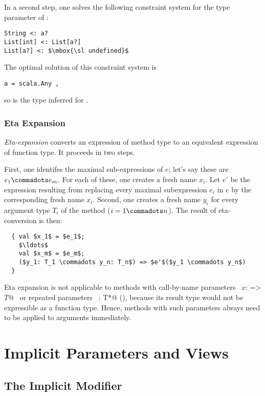 In a second step, one solves the following constraint system for
the type parameter  of :
\begin{lstlisting}
String <: a?
List[int] <: List[a?]
List[a?] <: $\mbox{\sl undefined}$
\end{lstlisting}
The optimal solution of this constraint system is
\begin{lstlisting}
a = scala.Any ,
\end{lstlisting}
so  is the type inferred for .

\subsection{Eta Expansion}\label{sec:eta-expand}

  {\em Eta-expansion} converts an expression of method type to an
  equivalent expression of function type. It proceeds in two steps.

  First, one identifes the maximal sub-expressions of $e$; let's
  say these are $e_1 \commadots e_m$. For each of these, one creates a
  fresh name $x_i$. Let $e'$ be the expression resulting from
  replacing every maximal subexpression $e_i$ in $e$ by the
  corresponding fresh name $x_i$. Second, one creates a fresh name $y_i$
  for every argument type $T_i$ of the method ($i = 1 \commadots
  n$). The result of eta-conversion is then:
\begin{lstlisting}
  { val $x_1$ = $e_1$; 
    $\ldots$ 
    val $x_m$ = $e_m$; 
    ($y_1: T_1 \commadots y_n: T_n$) => $e'$($y_1 \commadots y_n$) 
  }
\end{lstlisting}

Eta expansion is not applicable to methods with call-by-name
parameters ~\lstinline@$x$: => $T$@~ or repeated parameters
~\lstinline@x: T*@ (), because its result type
would not be expressible as a function type. Hence, methods with such
parameters always need to be applied to arguments immediately.

\chapter{Implicit Parameters and Views}\label{sec:implicits}

\section{The Implicit Modifier}\label{sec:impl-defs}


